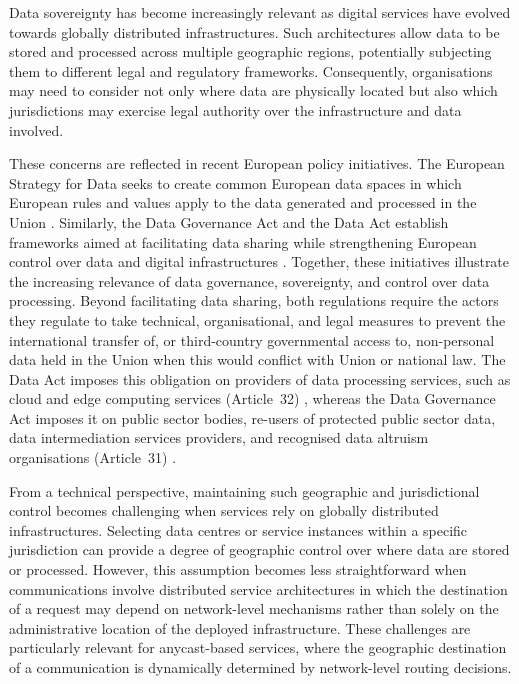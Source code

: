 \documentclass[
A4paper,                %
twoside,                %
openright,              %
chapterprefix=true,     %
12pt,                   %
headings=normal,        %
titlepage=on            %
]{book}
\begin{document}
Data sovereignty has become increasingly relevant as digital services have evolved towards globally distributed infrastructures. Such architectures allow data to be stored and processed across multiple geographic regions, potentially subjecting them to different legal and regulatory frameworks. Consequently, organisations may need to consider not only where data are physically located but also which jurisdictions may exercise legal authority over the infrastructure and data involved.

These concerns are reflected in recent European policy initiatives. The European Strategy for Data seeks to create common European data spaces in which European rules and values apply to the data generated and processed in the Union \cite{COMMUNICATIONData}. Similarly, the Data Governance Act and the Data Act establish frameworks aimed at facilitating data sharing while strengthening European control over data and digital infrastructures \cite{2022DataActb,2022DataAct}. Together, these initiatives illustrate the increasing relevance of data governance, sovereignty, and control over data processing. Beyond facilitating data sharing, both regulations require the actors they regulate to take technical, organisational, and legal measures to prevent the international transfer of, or third-country governmental access to, non-personal data held in the Union when this would conflict with Union or national law. The Data Act imposes this obligation on providers of data processing services, such as cloud and edge computing services (Article~32) \cite{2022DataAct}, whereas the Data Governance Act imposes it on public sector bodies, re-users of protected public sector data, data intermediation services providers, and recognised data altruism organisations (Article~31) \cite{2022DataActb}.

From a technical perspective, maintaining such geographic and jurisdictional control becomes challenging when services rely on globally distributed infrastructures. Selecting data centres or service instances within a specific jurisdiction can provide a degree of geographic control over where data are stored or processed. However, this assumption becomes less straightforward when communications involve distributed service architectures in which the destination of a request may depend on network-level mechanisms rather than solely on the administrative location of the deployed infrastructure. These challenges are particularly relevant for anycast-based services, where the geographic destination of a communication is dynamically determined by network-level routing decisions.
\end{document}
